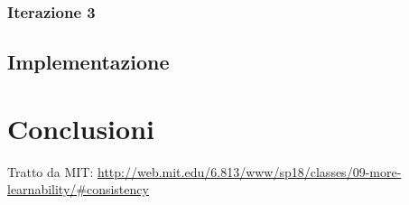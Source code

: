 \documentclass[Lau, oneside]{sapthesis}%
\begin{document}
\subsection{Iterazione 3}


\section{Implementazione}
\label{sec:dev}


\chapter{Conclusioni}
\label{ch:4}

\backmatter
{}
\begin{thebibliography}{17}

Tratto da MIT:
\url{http://web.mit.edu/6.813/www/sp18/classes/09-more-learnability/#consistency}

\end{thebibliography}
\end{document}

